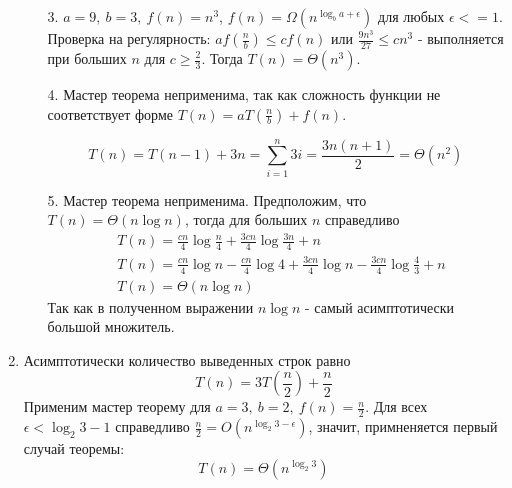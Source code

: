 \documentclass{article}
\begin{document}
\begin{enumerate}
\begin{enumerate}
              \item[3.] $a = 9, \ b = 3, \ f(n) = n^3$, $f(n) = \Omega(n^{\log_b{a} + \epsilon})$ для любых $\epsilon <= 1$. Проверка на регулярность: $af(\frac{n}{b}) \leq cf(n)$ или $\frac{9n^3}{27} \leq cn^3$ - выполняется при больших $n$ для $c \geq \frac{2}{3}$. Тогда $T(n) = \Theta(n^3)$.

              \item[4.] Мастер теорема неприменима, так как сложность функции не соответствует форме $T(n) = aT(\frac{n}{b}) + f(n)$.

                  $$
                      T(n) = T(n-1) + 3n = \sum_{i=1}^n{3i} = \frac{3n(n+1)}{2} = \Theta(n^2)
                  $$

              \item[5.] Мастер теорема неприменима. Предположим, что $T(n) = \Theta(n\log{n})$, тогда для больших $n$ справедливо
                  \begin{align*}
                       & T(n) = \frac{cn}{4}\log{\frac{n}{4}} + \frac{3cn}{4}\log{\frac{3n}{4}} + n                                   \\
                       & T(n) = \frac{cn}{4}\log{n} - \frac{cn}{4}\log{4} + \frac{3cn}{4}\log{n} - \frac{3cn}{4}\log{\frac{4}{3}} + n \\
                       & T(n) = \Theta(n\log{n})
                  \end{align*}
                  Так как в полученном выражении $n\log{n}$ - самый асимптотически большой множитель.
          \end{enumerate}

    \item Асимптотически количество выведенных строк равно
          $$
              T(n) = 3T(\frac{n}{2}) + \frac{n}{2}
          $$
          Применим мастер теорему для $a = 3, \ b = 2, \ f(n) = \frac{n}{2}$. Для всех $\epsilon < \log_2{3} - 1$ справедливо $\frac{n}{2} = O(n^{\log_2{3} - \epsilon})$, значит, примненяется первый случай теоремы:
          $$
              T(n) = \Theta(n^{\log_2{3}})
          $$

\end{enumerate}
\end{document}

